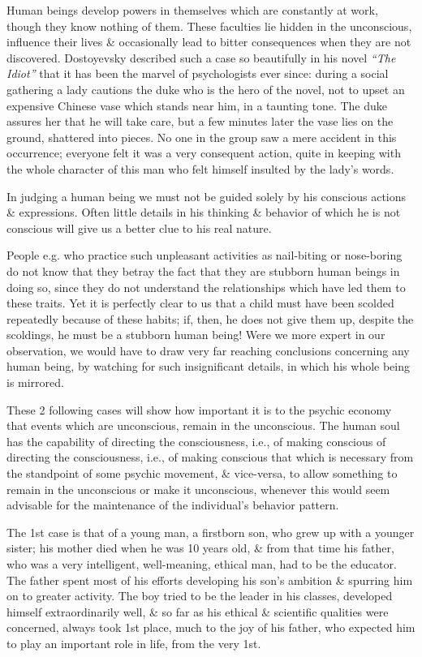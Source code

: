 \documentclass{article}
\begin{document}
Human beings develop powers in themselves which are constantly at work, though they know nothing of them. These faculties lie hidden in the unconscious, influence their lives \& occasionally lead to bitter consequences when they are not discovered. Dostoyevsky described such a case so beautifully in his novel {\it``The Idiot''} that it has been the marvel of psychologists ever since: during a social gathering a lady cautions the duke who is the hero of the novel, not to upset an expensive Chinese vase which stands near him, in a taunting tone. The duke assures her that he will take care, but a few minutes later the vase lies on the ground, shattered into pieces. No one in the group saw a mere accident in this occurrence; everyone felt it was a very consequent action, quite in keeping with the whole character of this man who felt himself insulted by the lady's words.

In judging a human being we must not be guided solely by his conscious actions \& expressions. Often little details in his thinking \& behavior of which he is not conscious will give us a better clue to his real nature.

People e.g. who practice such unpleasant activities as nail-biting or nose-boring do not know that they betray the fact that they are stubborn human beings in doing so, since they do not understand the relationships which have led them to these traits. Yet it is perfectly clear to us that a child must have been scolded repeatedly because of these habits; if, then, he does not give them up, despite the scoldings, he must be a stubborn human being! Were we more expert in our observation, we would have to draw very far reaching conclusions concerning any human being, by watching for such insignificant details, in which his whole being is mirrored.

These 2 following cases will show how important it is to the psychic economy that events which are unconscious, remain in the unconscious. The human soul has the capability of directing the consciousness, i.e., of making conscious of directing the consciousness, i.e., of making conscious that which is necessary from the standpoint of some psychic movement, \& vice-versa, to allow something to remain in the unconscious or make it unconscious, whenever this would seem advisable for the maintenance of the individual's behavior pattern.

The 1st case is that of a young man, a firstborn son, who grew up with a younger sister; his mother died when he was 10 years old, \& from that time his father, who was a very intelligent, well-meaning, ethical man, had to be the educator. The father spent most of his efforts developing his son's ambition \& spurring him on to greater activity. The boy tried to be the leader in his classes, developed himself extraordinarily well, \& so far as his ethical \& scientific qualities were concerned, always took 1st place, much to the joy of his father, who expected him to play an important role in life, from the very 1st.
\end{document}
